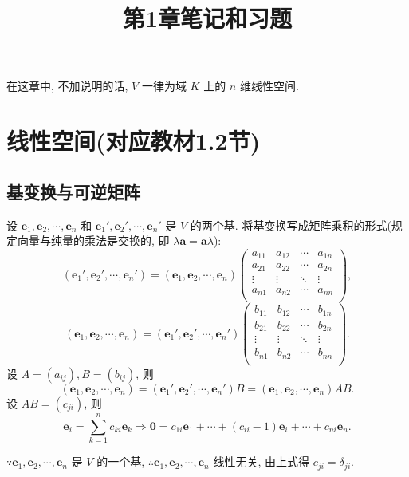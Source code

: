 \documentclass[color=black,device=normal,lang=cn,mode=geye]{elegantnote}
\title{第1章笔记和习题}
\begin{document}
\maketitle
在这章中, 不加说明的话, $V$ 一律为域 $K$ 上的 $n$ 维线性空间.
\section{线性空间(对应教材1.2节)}
\subsection{基变换与可逆矩阵}
设 $\boldsymbol{e}_1,\boldsymbol{e}_2,\cdots,\boldsymbol{e}_n$ 和 $\boldsymbol{e}_1',\boldsymbol{e}_2',\cdots,\boldsymbol{e}_n'$ 是 $V$ 的两个基. 将基变换写成矩阵乘积的形式(规定向量与纯量的乘法是交换的, 即 $\lambda\boldsymbol{a}=\boldsymbol{a}\lambda$):
\begin{equation}\label{eq1.1}
    (\boldsymbol{e}_1',\boldsymbol{e}_2',\cdots,\boldsymbol{e}_n')=(\boldsymbol{e}_1,\boldsymbol{e}_2,\cdots,\boldsymbol{e}_n)\begin{pmatrix}
        a_{11} & a_{12} & \cdots & a_{1n} \\
        a_{21} & a_{22} & \cdots & a_{2n} \\
        \vdots & \vdots & \ddots & \vdots \\
        a_{n1} & a_{n2} & \cdots & a_{nn} \\
    \end{pmatrix},
\end{equation}
\[(\boldsymbol{e}_1,\boldsymbol{e}_2,\cdots,\boldsymbol{e}_n)=(\boldsymbol{e}_1',\boldsymbol{e}_2',\cdots,\boldsymbol{e}_n')\begin{pmatrix}
    b_{11} & b_{12} & \cdots & b_{1n} \\
    b_{21} & b_{22} & \cdots & b_{2n} \\
    \vdots & \vdots & \ddots & \vdots \\
    b_{n1} & b_{n2} & \cdots & b_{nn} \\
\end{pmatrix}.\]
设 $A=(a_{ij}),B=(b_{ij})$, 则
\[(\boldsymbol{e}_1,\boldsymbol{e}_2,\cdots,\boldsymbol{e}_n)=(\boldsymbol{e}_1',\boldsymbol{e}_2',\cdots,\boldsymbol{e}_n')B=(\boldsymbol{e}_1,\boldsymbol{e}_2,\cdots,\boldsymbol{e}_n)AB.\]
设 $AB=(c_{ji})$, 则
\[\boldsymbol{e}_i=\sum\limits_{k=1}^nc_{ki}\boldsymbol{e}_k\Rightarrow\boldsymbol{0}=c_{1i}\boldsymbol{e}_1+\cdots+(c_{ii}-1)\boldsymbol{e}_i+\cdots+c_{ni}\boldsymbol{e}_n.\]

$\because\boldsymbol{e}_1,\boldsymbol{e}_2,\cdots,\boldsymbol{e}_n$ 是 $V$ 的一个基, $\therefore\boldsymbol{e}_1,\boldsymbol{e}_2,\cdots,\boldsymbol{e}_n$ 线性无关, 由上式得 $c_{ji}=\delta_{ji}$.
\end{document}
